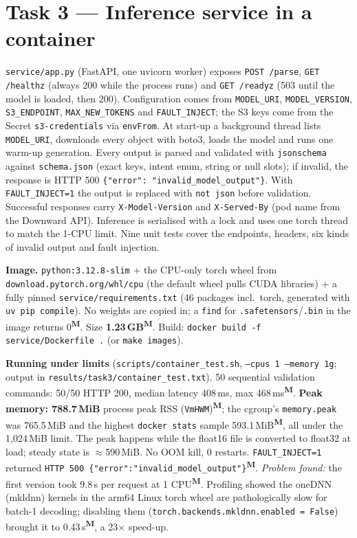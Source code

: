 \documentclass[10pt,a4paper]{article}
\newcommand{\code}[1]{\texttt{\small #1}}
\newcommand{\meas}{\textsuperscript{\textbf{M}}}
\begin{document}
\section{Task 3 --- Inference service in a container}
\code{service/app.py} (FastAPI, one uvicorn worker) exposes \code{POST /parse}, \code{GET /healthz} (always 200
while the process runs) and \code{GET /readyz} (503 until the model is loaded, then 200). Configuration comes from
\code{MODEL\_URI}, \code{MODEL\_VERSION}, \code{S3\_ENDPOINT}, \code{MAX\_NEW\_TOKENS} and \code{FAULT\_INJECT}; the
S3 keys come from the Secret \code{s3-credentials} via \code{envFrom}. At start-up a background thread lists
\code{MODEL\_URI}, downloads every object with boto3, loads the model and runs one warm-up generation. Every
output is parsed and validated with \code{jsonschema} against \code{schema.json} (exact keys, intent enum, string or
null slots); if invalid, the response is HTTP 500 \code{\{"error": "invalid\_model\_output"\}}. With
\code{FAULT\_INJECT=1} the output is replaced with \code{not json} before validation. Successful responses carry
\code{X-Model-Version} and \code{X-Served-By} (pod name from the Downward API). Inference is serialised with a lock
and uses one torch thread to match the 1-CPU limit. Nine unit tests cover the endpoints, headers, six kinds of
invalid output and fault injection.

\textbf{Image.} \code{python:3.12.8-slim} + the CPU-only torch wheel from \code{download.pytorch.org/whl/cpu}
(the default wheel pulls CUDA libraries) + a fully pinned \code{service/requirements.txt} (46 packages incl.\ torch, generated
with \code{uv pip compile}). No weights are copied in; a \code{find} for \code{*.safetensors}/\code{*.bin} in the
image returns 0\meas{}. Size \textbf{1.23\,GB}\meas{}. Build: \code{docker build -f service/Dockerfile .} (or
\code{make images}).

\textbf{Running under limits} (\code{scripts/container\_test.sh}, \code{--cpus 1 --memory 1g}; output in
\code{results/task3/container\_test.txt}). 50 sequential validation commands: 50/50 HTTP 200, median latency
408\,ms, max 468\,ms\meas{}. \textbf{Peak memory: 788.7\,MiB} process peak RSS (\code{VmHWM})\meas{}; the
cgroup's \code{memory.peak} was 765.5\,MiB and the highest \code{docker stats} sample 593.1\,MiB\meas{}, all under
the 1,024\,MiB limit. The peak happens while the float16 file is converted to float32 at load; steady state is
$\approx$590\,MiB. No OOM kill, 0 restarts. \code{FAULT\_INJECT=1} returned
\code{HTTP 500 \{"error":"invalid\_model\_output"\}}\meas{}.
\emph{Problem found:} the first version took 9.8\,s per request at 1 CPU\meas{}. Profiling showed the oneDNN
(mkldnn) kernels in the arm64 Linux torch wheel are pathologically slow for batch-1 decoding; disabling them
(\code{torch.backends.mkldnn.enabled = False}) brought it to 0.43\,s\meas{}, a 23$\times$ speed-up.
\end{document}

